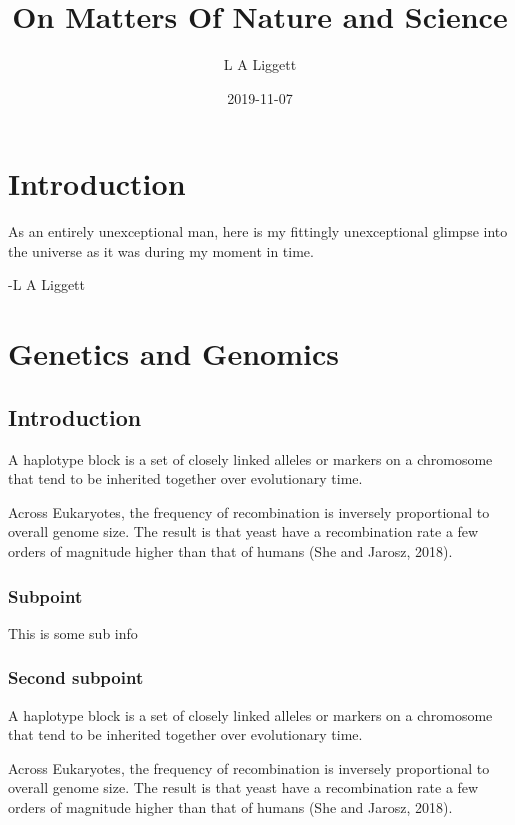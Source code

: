 \documentclass[]{book}
\title{On Matters Of Nature and Science}
\author{L A Liggett}
\date{2019-11-07}
\begin{document}
\maketitle

{
\setcounter{tocdepth}{1}
\tableofcontents
}
\hypertarget{introduction}{%
\chapter{Introduction}\label{introduction}}

As an entirely unexceptional man, here is my fittingly unexceptional glimpse into the universe as it was during my moment in time.

-L A Liggett

\hypertarget{g2}{%
\chapter{Genetics and Genomics}\label{g2}}

\hypertarget{introduction-1}{%
\section{Introduction}\label{introduction-1}}

A haplotype block is a set of closely linked alleles or markers on a chromosome that tend to be inherited together over evolutionary time.

Across Eukaryotes, the frequency of recombination is inversely proportional to overall genome size. The result is that yeast have a recombination rate a few orders of magnitude higher than that of humans (She and Jarosz, 2018).

\hypertarget{subpoint}{%
\subsection{Subpoint}\label{subpoint}}

This is some sub info

\hypertarget{second-subpoint}{%
\subsection{Second subpoint}\label{second-subpoint}}

A haplotype block is a set of closely linked alleles or markers on a chromosome that tend to be inherited together over evolutionary time.

Across Eukaryotes, the frequency of recombination is inversely proportional to overall genome size. The result is that yeast have a recombination rate a few orders of magnitude higher than that of humans (She and Jarosz, 2018).
\end{document}
